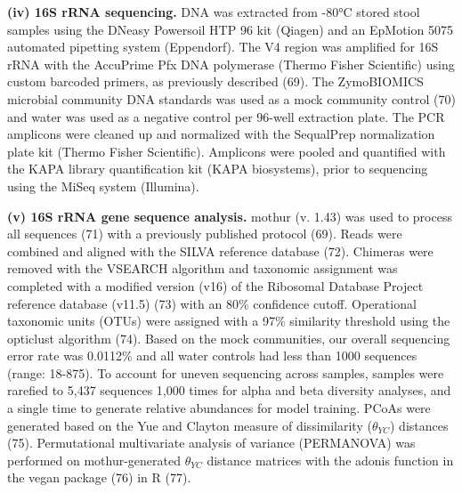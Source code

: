 \documentclass[
  11pt,
]{article}
\begin{document}
\textbf{(iv) 16S rRNA sequencing.} DNA was extracted from -80°C stored
stool samples using the DNeasy Powersoil HTP 96 kit (Qiagen) and an
EpMotion 5075 automated pipetting system (Eppendorf). The V4 region was
amplified for 16S rRNA with the AccuPrime Pfx DNA polymerase (Thermo
Fisher Scientific) using custom barcoded primers, as previously
described (69). The ZymoBIOMICS microbial community DNA standards was
used as a mock community control (70) and water was used as a negative
control per 96-well extraction plate. The PCR amplicons were cleaned up
and normalized with the SequalPrep normalization plate kit (Thermo
Fisher Scientific). Amplicons were pooled and quantified with the KAPA
library quantification kit (KAPA biosystems), prior to sequencing using
the MiSeq system (Illumina).

\textbf{(v) 16S rRNA gene sequence analysis.} mothur (v. 1.43) was used
to process all sequences (71) with a previously published protocol (69).
Reads were combined and aligned with the SILVA reference database (72).
Chimeras were removed with the VSEARCH algorithm and taxonomic
assignment was completed with a modified version (v16) of the Ribosomal
Database Project reference database (v11.5) (73) with an 80\% confidence
cutoff. Operational taxonomic units (OTUs) were assigned with a 97\%
similarity threshold using the opticlust algorithm (74). Based on the
mock communities, our overall sequencing error rate was 0.0112\% and all
water controls had less than 1000 sequences (range: 18-875). To account
for uneven sequencing across samples, samples were rarefied to 5,437
sequences 1,000 times for alpha and beta diversity analyses, and a
single time to generate relative abundances for model training. PCoAs
were generated based on the Yue and Clayton measure of dissimilarity
(\(\theta_{YC}\)) distances (75). Permutational multivariate analysis of
variance (PERMANOVA) was performed on mothur-generated \(\theta_{YC}\)
distance matrices with the adonis function in the vegan package (76) in
R (77).
\end{document}
